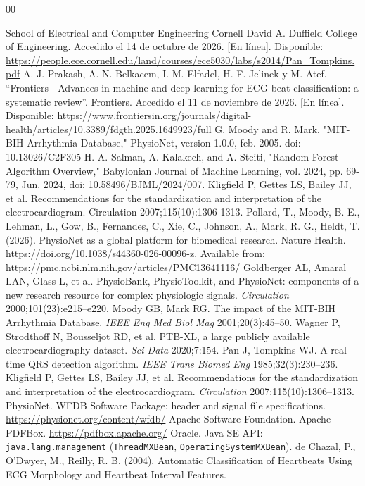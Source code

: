 \documentclass[conference]{IEEEtran}
\begin{document}
\begin{thebibliography}{00}


School of Electrical and Computer Engineering  Cornell David A. Duffield College of Engineering. Accedido el 14 de octubre de 2026. [En línea]. Disponible: \url{https://people.ece.cornell.edu/land/courses/ece5030/labs/s2014/Pan_Tompkins.pdf}
A. J. Prakash, A. N. Belkacem, I. M. Elfadel, H. F. Jelinek y M. Atef. “Frontiers | Advances in machine and deep learning for ECG beat classification: a systematic review”. Frontiers. Accedido el 11 de noviembre de 2026. [En línea]. Disponible: https://www.frontiersin.org/journals/digital-health/articles/10.3389/fdgth.2025.1649923/full
G. Moody and R. Mark, "MIT-BIH Arrhythmia Database," PhysioNet, version 1.0.0, feb. 2005. doi: 10.13026/C2F305
H. A. Salman, A. Kalakech, and A. Steiti, "Random Forest Algorithm Overview," Babylonian Journal of Machine Learning, vol. 2024, pp. 69-79, Jun. 2024, doi: 10.58496/BJML/2024/007.
Kligfield P, Gettes LS, Bailey JJ, et al. Recommendations
for the standardization and interpretation of
the electrocardiogram. Circulation 2007;115(10):1306-1313.
Pollard, T., Moody, B. E., Lehman, L., Gow, B., Fernandes, C., Xie, C., Johnson, A., Mark, R. G., Heldt, T. (2026). PhysioNet as a global platform for biomedical research. Nature Health. https://doi.org/10.1038/s44360-026-00096-z. Available from: https://pmc.ncbi.nlm.nih.gov/articles/PMC13641116/
 Goldberger AL, Amaral LAN, Glass L, et al. PhysioBank, PhysioToolkit, and PhysioNet: components of a new research resource for complex physiologic signals. \emph{Circulation} 2000;101(23):e215--e220.
 Moody GB, Mark RG. The impact of the MIT-BIH Arrhythmia Database. \emph{IEEE Eng Med Biol Mag} 2001;20(3):45--50.
 Wagner P, Strodthoff N, Bousseljot RD, et al. PTB-XL, a large publicly available electrocardiography dataset. \emph{Sci Data} 2020;7:154.
 Pan J, Tompkins WJ. A real-time QRS detection algorithm. \emph{IEEE Trans Biomed Eng} 1985;32(3):230--236.
 Kligfield P, Gettes LS, Bailey JJ, et al. Recommendations for the standardization and interpretation of the electrocardiogram. \emph{Circulation} 2007;115(10):1306--1313.
 PhysioNet. WFDB Software Package: header and signal file specifications. \url{https://physionet.org/content/wfdb/}
 Apache Software Foundation. Apache PDFBox. \url{https://pdfbox.apache.org/}
 Oracle. Java SE API: \texttt{java.lang.management} (\texttt{ThreadMXBean}, \texttt{OperatingSystemMXBean}).
de Chazal, P., O'Dwyer, M., Reilly, R. B. (2004). Automatic Classification of Heartbeats Using ECG Morphology and Heartbeat Interval Features.
\end{thebibliography}
\end{document}
